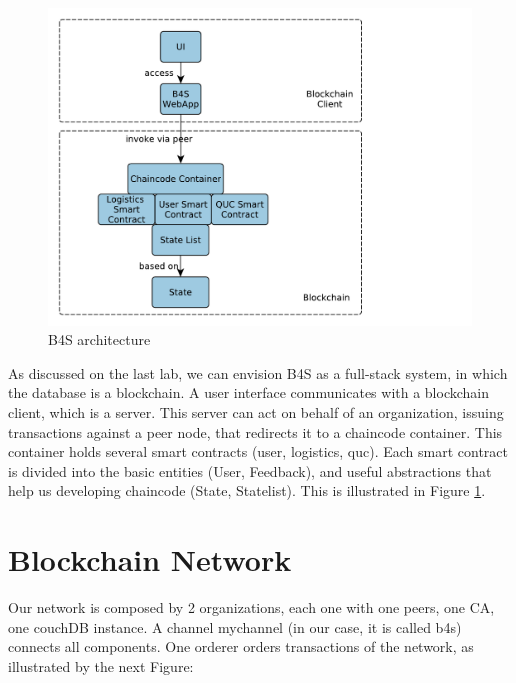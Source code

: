 \documentclass[12pt,a4paper]{article}
\theoremstyle{definition}
\begin{document}
\begin{figure}[h]
    \centering
    \includegraphics[scale=0.6]{figures/b4s_architecture.pdf}
    \caption{B4S architecture}
    \label{fig:b4s}
\end{figure}

As discussed on the last lab, we can envision B4S as a full-stack system, in which the database is a blockchain. A user interface communicates with a blockchain client, which is a server. This server can act on behalf of an organization, issuing transactions against a peer node, that redirects it to a chaincode container. This container holds several smart contracts (user, logistics, quc). Each smart contract is divided into the basic entities (User, Feedback), and useful abstractions that help us developing chaincode (State, Statelist). This is illustrated in Figure \ref{fig:b4s}.




\section{Blockchain Network}

Our network is composed by 2 organizations, each one with one peers, one CA, one couchDB instance. A channel mychannel (in our case, it is called b4s) connects all components. One orderer orders transactions of the network, as illustrated by the next Figure:
\end{document}
